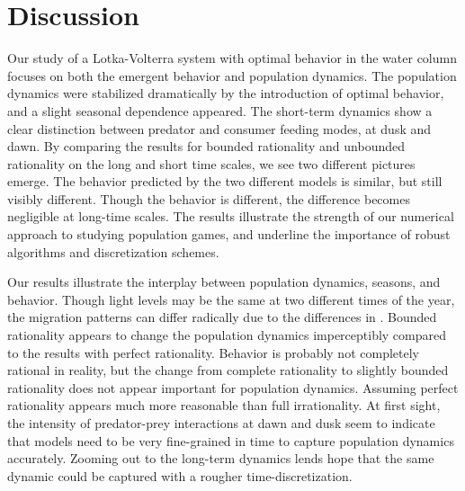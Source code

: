 \section{Discussion}
Our study of a Lotka-Volterra system with optimal behavior in the water column focuses on both the emergent behavior and population dynamics. The population dynamics were stabilized dramatically by the introduction of optimal behavior, and a slight seasonal dependence appeared. The short-term dynamics show a clear distinction between predator and consumer feeding modes,  at dusk and dawn. By comparing the results for bounded rationality and unbounded rationality on the long and short time scales, we see two different pictures emerge. The behavior predicted by the two different models is similar, but still visibly different. Though the behavior is different, the difference becomes negligible at long-time scales. The results illustrate the strength of our numerical approach to studying population games, and underline the importance of robust algorithms and discretization schemes.


Our results illustrate the interplay between population dynamics, seasons, and behavior. Though light levels may be the same at two different times of the year, the migration patterns can differ radically due to the differences in . Bounded rationality appears to change the population dynamics imperceptibly compared to the results with perfect rationality. Behavior is probably not completely rational in reality, but the change from complete rationality to slightly  bounded rationality does not appear important for population dynamics. Assuming perfect rationality appears much more reasonable than full irrationality. At first sight, the intensity of predator-prey interactions at dawn and dusk seem to indicate that models need to be very fine-grained in time to capture population dynamics accurately. Zooming out to the long-term dynamics lends hope that the same dynamic could be captured with a rougher time-discretization.


